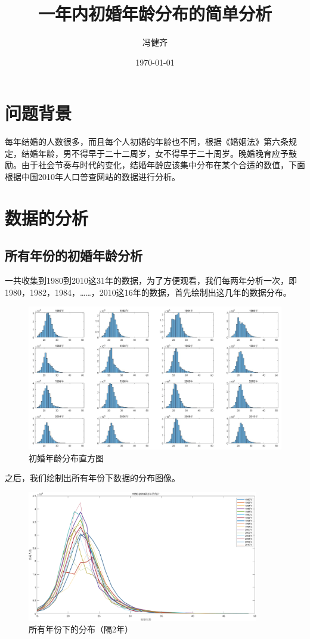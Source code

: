 \documentclass{ctexart}
\title{\vspace{+4cm}\textbf{一年内初婚年龄分布的简单分析}}
\author{冯健齐}
\date{\today}
\begin{document}
\maketitle
\newpage
{}
\setcounter{page}{0}
\tableofcontents
\newpage
\setcounter{page}{1}

\section{问题背景}
\setlength{\parindent}{2em}每年结婚的人数很多，而且每个人初婚的年龄也不同，根据《婚姻法》第六条规定，结婚年龄，男不得早于二十二周岁，女不得早于二十周岁。晚婚晚育应予鼓励。由于社会节奏与时代的变化，结婚年龄应该集中分布在某个合适的数值，下面根据中国2010年人口普查网站的数据\cite{ref1}进行分析。

\section{数据的分析}
\subsection{所有年份的初婚年龄分析}
\setlength{\parindent}{2em}一共收集到1980到2010这31年的数据，为了方便观看，我们每两年分析一次，即1980，1982，1984，……，2010这16年的数据，首先绘制出这几年的数据分布。


\begin{figure}[h!]
\centering
\includegraphics[width=1\textwidth]{001.JPG}
\caption{初婚年龄分布直方图}
\end{figure}


\setlength{\parindent}{2em}之后，我们绘制出所有年份下数据的分布图像。
\begin{figure}[h!]
\centering
\includegraphics[width=0.9\textwidth]{002.png}
\caption{所有年份下的分布（隔2年）}
\end{figure}
\end{document}
